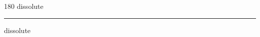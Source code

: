 
\begin{frame}
\begin{center}
\begin{turn}{180}
{\fontsize{2.5cm}{1em}\selectfont dissolute}
\end{turn}
\vspace{1em}\par  
\hrule
\vspace{1em}\par  
{\fontsize{2.5cm}{1em}\selectfont dissolute}
\end{center}
\end{frame}
